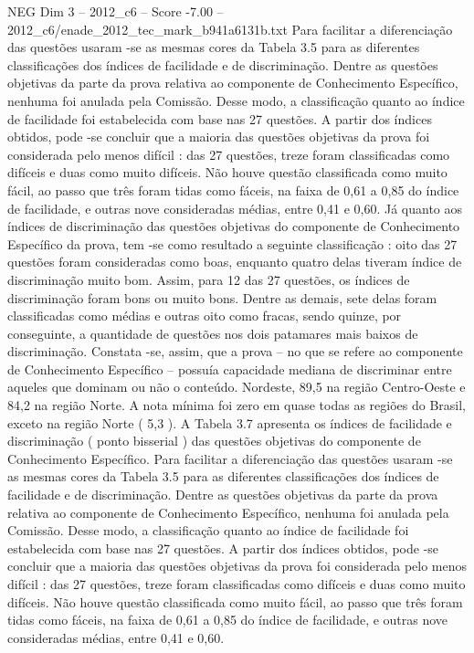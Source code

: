\begin{textsample}{NEG Dim 3 – 2012\_c6 – Score -7.00 – 2012\_c6/enade\_2012\_tec\_mark\_b941a6131b.txt}
Para facilitar a diferenciação das questões usaram -se as mesmas cores da Tabela 3.5 para as diferentes classificações dos índices de facilidade e de discriminação.
Dentre as questões objetivas da parte da prova relativa ao componente de Conhecimento Específico, nenhuma foi anulada pela Comissão.
Desse modo, a classificação quanto ao índice de facilidade foi estabelecida com base nas 27 questões.
A partir dos índices obtidos, pode -se concluir que a maioria das questões objetivas da prova foi considerada pelo menos difícil : das 27 questões, treze foram classificadas como difíceis e duas como muito difíceis.
Não houve questão classificada como muito fácil, ao passo que três foram tidas como fáceis, na faixa de 0,61 a 0,85 do índice de facilidade, e outras nove consideradas médias, entre 0,41 e 0,60.
Já quanto aos índices de discriminação das questões objetivas do componente de Conhecimento Específico da prova, tem -se como resultado a seguinte classificação : oito das 27 questões foram consideradas como boas, enquanto quatro delas tiveram índice de discriminação muito bom.
Assim, para 12 das 27 questões, os índices de discriminação foram bons ou muito bons.
Dentre as demais, sete delas foram classificadas como médias e outras oito como fracas, sendo quinze, por conseguinte, a quantidade de questões nos dois patamares mais baixos de discriminação.
Constata -se, assim, que a prova – no que se refere ao componente de Conhecimento Específico – possuía capacidade mediana de discriminar entre aqueles que dominam ou não o conteúdo.
Nordeste, 89,5 na região Centro-Oeste e 84,2 na região Norte.
A nota mínima foi zero em quase todas as regiões do Brasil, exceto na região Norte ( 5,3 ).
A Tabela 3.7 apresenta os índices de facilidade e discriminação ( ponto bisserial ) das questões objetivas do componente de Conhecimento Específico.
Para facilitar a diferenciação das questões usaram -se as mesmas cores da Tabela 3.5 para as diferentes classificações dos índices de facilidade e de discriminação.
Dentre as questões objetivas da parte da prova relativa ao componente de Conhecimento Específico, nenhuma foi anulada pela Comissão.
Desse modo, a classificação quanto ao índice de facilidade foi estabelecida com base nas 27 questões.
A partir dos índices obtidos, pode -se concluir que a maioria das questões objetivas da prova foi considerada pelo menos difícil : das 27 questões, treze foram classificadas como difíceis e duas como muito difíceis.
Não houve questão classificada como muito fácil, ao passo que três foram tidas como fáceis, na faixa de 0,61 a 0,85 do índice de facilidade, e outras nove consideradas médias, entre 0,41 e 0,60.

\end{textsample}
